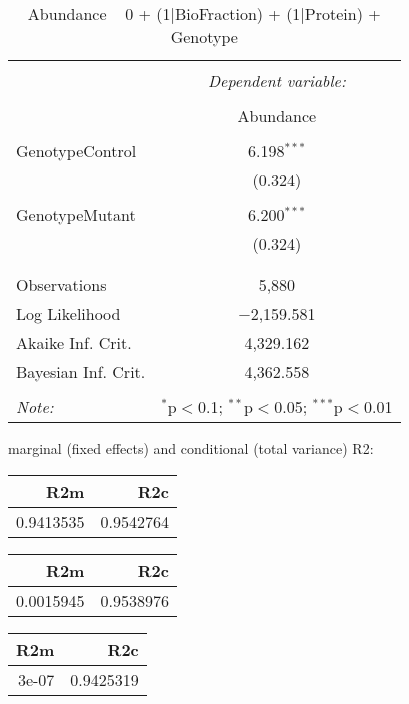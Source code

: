 \documentclass[11pt]{report}
\begin{document}
\begin{table}[!htbp] \centering 
  \caption{Abundance ~ 0 + (1|BioFraction) + (1|Protein) + Genotype} 
  \label{} 
\begin{tabular}{@{\extracolsep{5pt}}lc} 
\\[-1.8ex]\hline 
\hline \\[-1.8ex] 
 & \multicolumn{1}{c}{\textit{Dependent variable:}} \\ 
\cline{2-2} 
\\[-1.8ex] & Abundance \\ 
\hline \\[-1.8ex] 
 GenotypeControl & 6.198$^{***}$ \\ 
  & (0.324) \\ 
  & \\ 
 GenotypeMutant & 6.200$^{***}$ \\ 
  & (0.324) \\ 
  & \\ 
\hline \\[-1.8ex] 
Observations & 5,880 \\ 
Log Likelihood & $-$2,159.581 \\ 
Akaike Inf. Crit. & 4,329.162 \\ 
Bayesian Inf. Crit. & 4,362.558 \\ 
\hline 
\hline \\[-1.8ex] 
\textit{Note:}  & \multicolumn{1}{r}{$^{*}$p$<$0.1; $^{**}$p$<$0.05; $^{***}$p$<$0.01} \\ 
\end{tabular} 
\end{table} 
marginal (fixed effects) and conditional (total variance) R2:

\begin{tabular}{r|r}
\hline
R2m & R2c\\
\hline
0.9413535 & 0.9542764\\
\hline
\end{tabular}

\begin{tabular}{r|r}
\hline
R2m & R2c\\
\hline
0.0015945 & 0.9538976\\
\hline
\end{tabular}

\begin{tabular}{r|r}
\hline
R2m & R2c\\
\hline
3e-07 & 0.9425319\\
\hline
\end{tabular}
\end{document}
